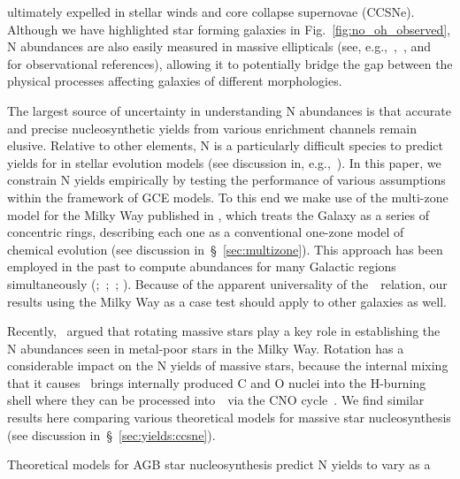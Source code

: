 \documentclass[ms.tex]{subfiles}
\begin{document}
ultimately expelled in stellar winds and core collapse supernovae (CCSNe).
Although we have highlighted star forming galaxies in
Fig.~\ref{fig:no_oh_observed}, N abundances are also easily measured in
massive ellipticals (see, e.g.,~\citealp{Schiavon2010},~\citealp{Conroy2013},
and~\citealp*{Conroy2014} for observational references), allowing it to
potentially bridge the gap between the physical processes affecting galaxies of
different morphologies.
\par
The largest source of uncertainty in understanding N abundances is that
accurate and precise nucleosynthetic yields from various enrichment channels
remain elusive.
Relative to other elements, N is a particularly difficult species to predict
yields for in stellar evolution models (see discussion in,
e.g.,~\citealp{Andrews2017}).
In this paper, we constrain N yields empirically by testing the performance of
various assumptions within the framework of GCE models.
To this end we make use of the multi-zone model for the Milky Way published in
\citet{Johnson2021}, which treats the Galaxy as a series of concentric rings,
describing each one as a conventional one-zone model of chemical evolution
(see discussion in~\S~\ref{sec:multizone}).
This approach has been employed in the past to compute abundances for many
Galactic regions simultaneously (\citealp{Matteucci1989, Wyse1989, Prantzos1995,
Schoenrich2009};~\citealp*{Minchev2013, Minchev2014};~\citealp{Minchev2017};
\citealp*{Sharma2021}).
Because of the apparent universality of the~\ohno~relation, our results using
the Milky Way as a case test should apply to other galaxies as well.
\par
Recently,~\citet*{Grisoni2021} argued that rotating massive stars play a key
role in establishing the N abundances seen in metal-poor stars in the Milky Way.
Rotation has a considerable impact on the N yields of massive stars, because the
internal mixing that it causes~\citep{Zahn1992, Maeder1998, Lagarde2012} brings
internally produced C and O nuclei into the H-burning shell where they can be
processed into~\Nfourteen~via the CNO cycle~\citep{Heger2010, Frischknecht2016,
Andrews2017}.
We find similar results here comparing various theoretical models for
massive star nucleosynthesis (see discussion in~\S~\ref{sec:yields:ccsne}).
\par
Theoretical models for AGB star nucleosynthesis predict N yields to vary as a
\end{document}
